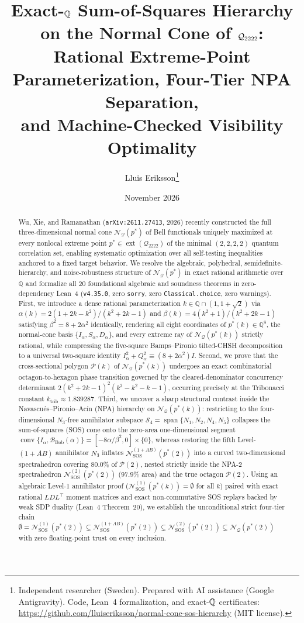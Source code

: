 \documentclass[11pt,a4paper]{article}
\title{\textbf{Exact-$\QQ$ Sum-of-Squares Hierarchy on the Normal Cone of $\calQ$:\\
Rational Extreme-Point Parameterization, Four-Tier NPA Separation,\\
and Machine-Checked Visibility Optimality}}
\author{Lluis Eriksson\thanks{Independent researcher (Sweden). Prepared with AI assistance (Google Antigravity). Code, Lean~4 formalization, and exact-$\QQ$ certificates: \url{https://github.com/lluiseriksson/normal-cone-sos-hierarchy} (MIT license).}}
\date{November 2026}
\newcommand{\QQ}{\mathbb{Q}}
\newcommand{\calQ}{\mathcal{Q}_{2222}}
\newcommand{\calN}{\mathcal{N}_{\mathcal{Q}}}
\newcommand{\calP}{\mathcal{P}}
\newcommand{\calB}{\mathcal{B}}
\newcommand{\calS}{\mathcal{S}}
\newcommand{\ext}{\operatorname{ext}}
\newcommand{\conv}{\operatorname{conv}}
\begin{document}
\maketitle

\begin{abstract}
Wu, Xie, and Ramanathan (\texttt{arXiv:2611.27413}, 2026) recently constructed the full three-dimensional normal cone $\calN(p^*)$ of Bell functionals uniquely maximized at every nonlocal extreme point $p^* \in \ext(\calQ)$ of the minimal $(2,2,2,2)$ quantum correlation set, enabling systematic optimization over all self-testing inequalities anchored to a fixed target behavior.
We resolve the algebraic, polyhedral, semidefinite-hierarchy, and noise-robustness structure of $\calN(p^*)$ in exact rational arithmetic over $\QQ$ and formalize all 20 foundational algebraic and soundness theorems in zero-dependency Lean~4 (\texttt{v4.35.0}, zero \texttt{sorry}, zero \texttt{Classical.choice}, zero warnings).
First, we introduce a dense rational parameterization $k \in \QQ \cap (1, 1+\sqrt{2})$ via $\alpha(k) = 2(1+2k-k^2)/(k^2+2k-1)$ and $\beta(k) = 4(k^2+1)/(k^2+2k-1)$ satisfying $\beta^2 = 8 + 2\alpha^2$ identically, rendering all eight coordinates of $p^*(k) \in \QQ^8$, the normal-cone basis $\{I_\alpha, S_\alpha, D_\alpha\}$, and every extreme ray of $\calN(p^*(k))$ strictly rational, while compressing the five-square Bamps--Pironio tilted-CHSH decomposition to a universal two-square identity $I_\alpha^2 + Q_\alpha^2 \equiv (8+2\alpha^2)I$.
Second, we prove that the cross-sectional polygon $\calP(k)$ of $\calN(p^*(k))$ undergoes an exact combinatorial octagon-to-hexagon phase transition governed by the cleared-denominator concurrency determinant $2(k^2+2k-1)^2(k^3-k^2-k-1)$, occurring precisely at the Tribonacci constant $k_{\mathrm{trib}} \approx 1.839287$.
Third, we uncover a sharp structural contrast inside the Navascu\'es--Pironio--Ac\'in (NPA) hierarchy on $\calN(p^*(k))$: restricting to the four-dimensional $N_3$-free annihilator subspace $\calS_4 = \operatorname{span}\{N_1, N_2, N_4, N_5\}$ collapses the sum-of-squares (SOS) cone onto the zero-area one-dimensional segment $\conv\{I_\alpha, \calB_{\mathrm{Bob}}(\alpha)\} = [-8\alpha/\beta^2, 0]\times\{0\}$, whereas restoring the fifth Level-$(1+AB)$ annihilator $N_3$ inflates $\mathcal{N}_{\mathrm{SOS}}^{(1+AB)}(p^*(2))$ into a curved two-dimensional spectrahedron covering $80.0\%$ of $\calP(2)$, nested strictly inside the NPA-2 spectrahedron $\mathcal{N}_{\mathrm{SOS}}^{(2)}(p^*(2))$ ($97.9\%$ area) and the true octagon $\calP(2)$.
Using an algebraic Level-1 annihilator proof ($\mathcal{N}_{\mathrm{SOS}}^{(1)}(p^*(k)) = \emptyset$ for all $k$) paired with exact rational $LDL^\top$ moment matrices and exact non-commutative SOS replays backed by weak SDP duality (Lean~4 Theorem~20), we establish the unconditional strict four-tier chain $\emptyset = \mathcal{N}_{\mathrm{SOS}}^{(1)}(p^*(2)) \subsetneq \mathcal{N}_{\mathrm{SOS}}^{(1+AB)}(p^*(2)) \subsetneq \mathcal{N}_{\mathrm{SOS}}^{(2)}(p^*(2)) \subsetneq \calN(p^*(2))$ with zero floating-point trust on every inclusion.

\end{abstract}
\end{document}
